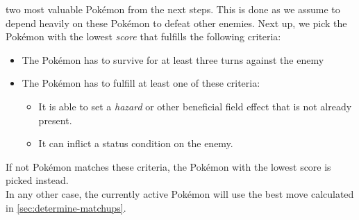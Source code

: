 two most valuable Pokémon from the next steps. This is done as we assume to depend heavily on these Pokémon to defeat
other enemies. Next up, we pick the Pokémon with the lowest \textit{score} that fulfills the following 
criteria:
\begin{itemize}
	\item The Pokémon has to survive for at least three turns against the enemy
	\item The Pokémon has to fulfill at least one of these criteria:
	\begin{itemize}
		\item It is able to set a \textit{hazard} or other beneficial field effect that is not already present.
		\item It can inflict a status condition on the enemy.
	\end{itemize}
\end{itemize}
If not Pokémon matches these criteria, the Pokémon with the lowest score is picked instead. \\
In any other case, the currently active Pokémon will use the best move calculated in \ref{sec:determine-matchups}.

